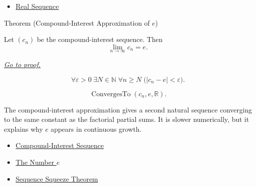 \begin{dependencies}
\begin{itemize}
  \item \hyperref[def:real-sequence]{Real Sequence}
\end{itemize}
\end{dependencies}


\begin{theorembox}{Theorem (Compound-Interest Approximation of $e$)}
\begin{theorem}
\label{thm:compound-interest-approximation-e}
Let $(c_n)$ be the compound-interest sequence. Then
\[
  \lim_{n\to\infty}c_n=e.
\]

\smallskip
\noindent
\hyperref[prf:compound-interest-approximation-e]{\textit{Go to proof.}}
\end{theorem}
\end{theorembox}

\begin{remark*}
\[
\forall \varepsilon>0\;\exists N\in\mathbb{N}\;\forall n\ge N
\;\bigl(|c_n-e|<\varepsilon\bigr).
\]
\end{remark*}

\begin{remark*}
\[
\operatorname{ConvergesTo}(c_n,e,\mathbb{R}).
\]
\end{remark*}

\begin{remark*}[Interpretation]
The compound-interest approximation gives a second natural sequence
converging to the same constant as the factorial partial sums. It is slower
numerically, but it explains why $e$ appears in continuous growth.
\end{remark*}

\begin{dependencies}
\begin{itemize}
  \item \hyperref[def:compound-interest-sequence]{Compound-Interest Sequence}
  \item \hyperref[def:number-e]{The Number $e$}
  \item \hyperref[thm:sequence-squeeze-theorem]{Sequence Squeeze Theorem}
\end{itemize}
\end{dependencies}

